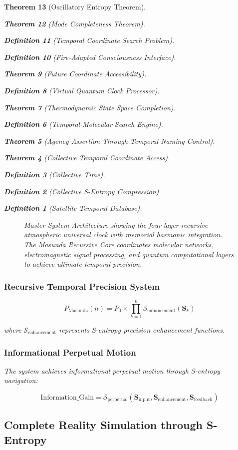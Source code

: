 \documentclass[12pt,a4paper]{article}
\newtheorem{theorem}{Theorem}[section]
\newtheorem{definition}[theorem]{Definition}
\begin{document}
\begin{theorem}[Oscillatory Entropy Theorem]
\begin{theorem}[Mode Completeness Theorem]
\begin{enumerate}
\begin{definition}[Temporal Coordinate Search Problem]
\begin{algorithm}
\begin{definition}[Fire-Adapted Consciousness Interface]
\begin{theorem}[Future Coordinate Accessibility]
\begin{definition}[Virtual Quantum Clock Processor]
\begin{itemize}
\begin{itemize}
\begin{theorem}[Thermodynamic State Space Completion]
\begin{definition}[Temporal-Molecular Search Engine]
\begin{theorem}[Agency Assertion Through Temporal Naming Control]
\begin{remark}
\begin{theorem}[Collective Temporal Coordinate Access]
\begin{definition}[Collective Time]
\begin{definition}[Collective S-Entropy Compression]
\begin{definition}[Satellite Temporal Database]
\begin{algorithm}
\begin{table}[h]
{{\begin{figure}[H]
\begin{tikzpicture}[scale=0.5]
\end{tikzpicture}
\caption{Master System Architecture showing the four-layer recursive atmospheric universal clock with memorial harmonic integration. The Masunda Recursive Core coordinates molecular networks, electromagnetic signal processing, and quantum computational layers to achieve ultimate temporal precision.}
\label{fig:atmospheric_universal_clock}
\end{figure}

\subsubsection{Recursive Temporal Precision System}

\begin{equation}
P_{\text{Masunda}}(n) = P_0 \times \prod_{k=1}^{n} \mathcal{S}_{\text{enhancement}}(\mathbf{S}_k)
\end{equation}

where $\mathcal{S}_{\text{enhancement}}$ represents S-entropy precision enhancement functions.

\subsubsection{Informational Perpetual Motion}

The system achieves informational perpetual motion through S-entropy navigation:

\begin{equation}
\text{Information\_Gain} = \mathcal{S}_{\text{perpetual}}(\mathbf{S}_{\text{input}}, \mathbf{S}_{\text{enhancement}}, \mathbf{S}_{\text{feedback}})
\end{equation}

\subsection{Complete Reality Simulation through S-Entropy}

}}
\end{table}
\end{algorithm}
\end{definition}
\end{definition}
\end{definition}
\end{theorem}
\end{remark}
\end{theorem}
\end{definition}
\end{theorem}
\end{itemize}
\end{itemize}
\end{definition}
\end{theorem}
\end{definition}
\end{algorithm}
\end{definition}
\end{enumerate}
\end{theorem}
\end{theorem}
\end{document}
